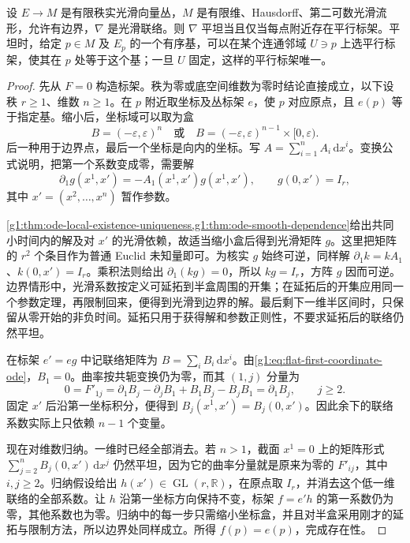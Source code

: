 \begin{theorem}
	\label{g1:thm:flat-parallel-frame}
	设 \(E\to M\) 是有限秩实光滑向量丛，\(M\) 是有限维、Hausdorff、第二可数光滑流形，允许有边界，\(\nabla\) 是光滑联络。则 \(\nabla\) 平坦当且仅当每点附近存在平行标架。平坦时，给定 \(p\in M\) 及 \(E_p\) 的一个有序基，可以在某个连通邻域 \(U\ni p\) 上选平行标架，使其在 \(p\) 处等于这个基；一旦 \(U\) 固定，这样的平行标架唯一。
\end{theorem}
\begin{proof}
	先从 \(F=0\) 构造标架。秩为零或底空间维数为零时结论直接成立，以下设秩 \(r\geq1\)、维数 \(n\geq1\)。在 \(p\) 附近取坐标及丛标架 \(e\)，使 \(p\) 对应原点，且 \(e(p)\) 等于指定基。缩小后，坐标域可以取为盒
	\[
		B=(-\varepsilon,\varepsilon)^n
		\quad\text{或}\quad
		B=(-\varepsilon,\varepsilon)^{n-1}\times[0,\varepsilon).
	\]
	后一种用于边界点，最后一个坐标是向内的坐标。写 \(A=\sum_{i=1}^n A_i\,\mathrm{d}x^i\)。变换公式说明，把第一个系数变成零，需要解
	\begin{equation}
		\label{g1:eq:flat-first-coordinate-ode}
		\partial_1g(x^1,x')=-A_1(x^1,x')g(x^1,x'),\qquad
		g(0,x')=I_r,
	\end{equation}
	其中 \(x'=(x^2,\ldots,x^n)\) 暂作参数。

	\cref{g1:thm:ode-local-existence-uniqueness,g1:thm:ode-smooth-dependence}给出共同小时间内的解及对 \(x'\) 的光滑依赖，故适当缩小盒后得到光滑矩阵 \(g\)。这里把矩阵的 \(r^2\) 个条目作为普通 Euclid 未知量即可。为核实 \(g\) 始终可逆，同样解 \(\partial_1k=kA_1\)、\(k(0,x')=I_r\)。乘积法则给出 \(\partial_1(kg)=0\)，所以 \(kg=I_r\)，方阵 \(g\) 因而可逆。边界情形中，光滑系数按定义可延拓到半盒周围的开集；在延拓后的开集应用同一个参数定理，再限制回来，便得到光滑到边界的解。最后剩下一维半区间时，只保留从零开始的非负时间。延拓只用于获得解和参数正则性，不要求延拓后的联络仍然平坦。

	在标架 \(e'=eg\) 中记联络矩阵为 \(B=\sum_iB_i\,\mathrm{d}x^i\)。由\eqref{g1:eq:flat-first-coordinate-ode}，\(B_1=0\)。曲率按共轭变换仍为零，而其 \((1,j)\) 分量为
	\[
		0=F'_{1j}
		=\partial_1B_j-\partial_jB_1+B_1B_j-B_jB_1
		=\partial_1B_j,\qquad j\geq2.
	\]
	固定 \(x'\) 后沿第一坐标积分，便得到 \(B_j(x^1,x')=B_j(0,x')\)。因此余下的联络系数实际上只依赖 \(n-1\) 个变量。

	现在对维数归纳。一维时已经全部消去。若 \(n>1\)，截面 \(x^1=0\) 上的矩阵形式 \(\sum_{j=2}^n B_j(0,x')\,\mathrm{d}x^j\) 仍然平坦，因为它的曲率分量就是原来为零的 \(F'_{ij}\)，其中 \(i,j\geq2\)。归纳假设给出 \(h(x')\in\operatorname{GL}(r,\mathbb R)\)，在原点取 \(I_r\)，并消去这个低一维联络的全部系数。让 \(h\) 沿第一坐标方向保持不变，标架 \(f=e' h\) 的第一系数仍为零，其他系数也为零。归纳中的每一步只需缩小坐标盒，并且对半盒采用刚才的延拓与限制方法，所以边界处同样成立。所得 \(f(p)=e(p)\)，完成存在性。


\end{proof}
